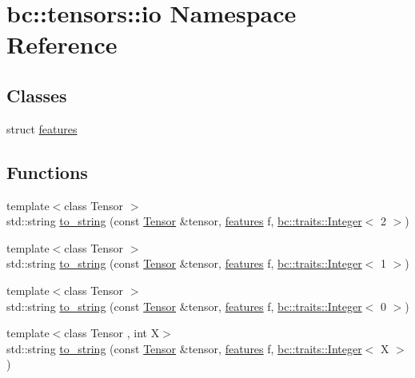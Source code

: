 \hypertarget{namespacebc_1_1tensors_1_1io}{}\section{bc\+:\+:tensors\+:\+:io Namespace Reference}
\label{namespacebc_1_1tensors_1_1io}
\subsection*{Classes}
\begin{DoxyCompactItemize}
\item 
struct \hyperlink{structbc_1_1tensors_1_1io_1_1features}{features}
\end{DoxyCompactItemize}
\subsection*{Functions}
\begin{DoxyCompactItemize}
\item 
{\footnotesize template$<$class Tensor $>$ }\\std\+::string \hyperlink{namespacebc_1_1tensors_1_1io_a6f4605b831f96dcdf9017221d2c65454}{to\+\_\+string} (const \hyperlink{namespacebc_a659391e47ab612be3ba6c18cf9c89159}{Tensor} \&tensor, \hyperlink{structbc_1_1tensors_1_1io_1_1features}{features} f, \hyperlink{structbc_1_1traits_1_1Integer}{bc\+::traits\+::\+Integer}$<$ 2 $>$)
\item 
{\footnotesize template$<$class Tensor $>$ }\\std\+::string \hyperlink{namespacebc_1_1tensors_1_1io_aae7dd280a6d62f82dc6d01292c33a0bc}{to\+\_\+string} (const \hyperlink{namespacebc_a659391e47ab612be3ba6c18cf9c89159}{Tensor} \&tensor, \hyperlink{structbc_1_1tensors_1_1io_1_1features}{features} f, \hyperlink{structbc_1_1traits_1_1Integer}{bc\+::traits\+::\+Integer}$<$ 1 $>$)
\item 
{\footnotesize template$<$class Tensor $>$ }\\std\+::string \hyperlink{namespacebc_1_1tensors_1_1io_a1659dd997f13b9fb9cb625abf93cb30b}{to\+\_\+string} (const \hyperlink{namespacebc_a659391e47ab612be3ba6c18cf9c89159}{Tensor} \&tensor, \hyperlink{structbc_1_1tensors_1_1io_1_1features}{features} f, \hyperlink{structbc_1_1traits_1_1Integer}{bc\+::traits\+::\+Integer}$<$ 0 $>$)
\item 
{\footnotesize template$<$class Tensor , int X$>$ }\\std\+::string \hyperlink{namespacebc_1_1tensors_1_1io_ab53182c7c4ee1f7c38b1dcbd80e41fcd}{to\+\_\+string} (const \hyperlink{namespacebc_a659391e47ab612be3ba6c18cf9c89159}{Tensor} \&tensor, \hyperlink{structbc_1_1tensors_1_1io_1_1features}{features} f, \hyperlink{structbc_1_1traits_1_1Integer}{bc\+::traits\+::\+Integer}$<$ X $>$)
\end{DoxyCompactItemize}


